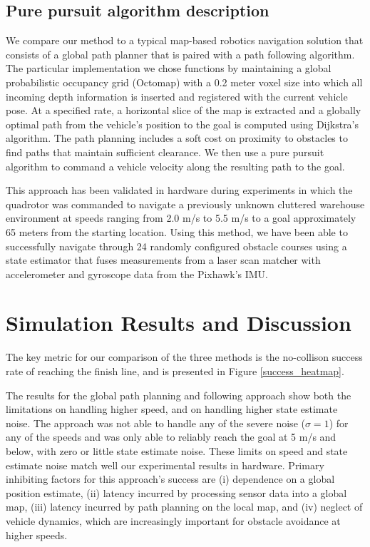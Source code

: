 \documentclass{llncs}
\begin{document}
\subsection{Pure pursuit algorithm description}

We compare our method to a typical map-based robotics navigation solution that consists of a global path planner that is paired with a path following algorithm.  The particular implementation we chose functions by maintaining a global probabilistic occupancy grid (Octomap) with a 0.2 meter voxel size into which all incoming depth information is inserted and registered with the current vehicle pose.  At a specified rate, a horizontal slice of the map is extracted and a globally optimal path from the vehicle's position to the goal is computed using Dijkstra's algorithm.  The path planning includes a soft cost on proximity to obstacles to find paths that maintain sufficient clearance.  We then use a pure pursuit algorithm to command a vehicle velocity along the resulting path to the goal.  

This approach has been validated in hardware during experiments in which the quadrotor was commanded to navigate a previously unknown cluttered warehouse environment at speeds ranging from 2.0 m/s to 5.5 m/s to a goal approximately 65 meters from the starting location.  Using this method, we have been able to successfully navigate through 24 randomly configured obstacle courses using a state estimator that fuses measurements from a laser scan matcher with accelerometer and gyroscope data from the Pixhawk's IMU.

\section{Simulation Results and Discussion}

The key metric for our comparison of the three methods is the no-collison success rate of reaching the finish line, and is presented in Figure \ref{success_heatmap}.

The results for the global path planning and following approach show both the limitations on handling higher speed, and on handling higher state estimate noise.  The approach was not able to handle any of the severe noise ($\sigma=1$) for any of the speeds and was only able to reliably reach the goal at 5 m/s and below, with zero or little state estimate noise.  These limits on speed and state estimate noise match well our experimental results in hardware.  Primary inhibiting factors for this approach's success are (i) dependence on a global position estimate, (ii) latency incurred by processing sensor data into a global map, (iii) latency incurred by path planning on the local map, and (iv) neglect of vehicle dynamics, which are increasingly important for obstacle avoidance at higher speeds.
\end{document}
